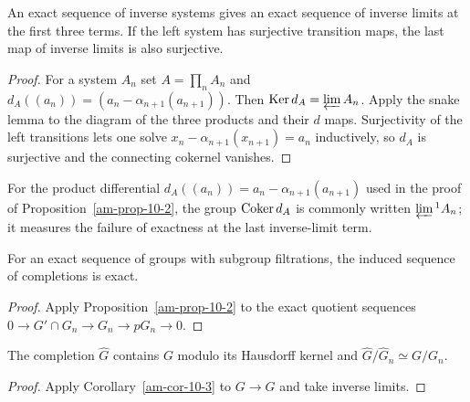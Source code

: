 \begin{proposition}
\label{am-prop-10-2}
\uses{}
An exact sequence of inverse systems gives an exact sequence of inverse limits
at the first three terms.  If the left system has surjective transition maps,
the last map of inverse limits is also surjective.
\end{proposition}
\begin{proof}
For a system $A_n$ set $A=\prod_nA_n$ and
$d_A((a_n))=(a_n-\alpha_{n+1}(a_{n+1}))$.  Then
$\operatorname{Ker} d_A=\varprojlim A_n$.  Apply the snake lemma to the diagram of the three
products and their $d$ maps.  Surjectivity of the left transitions lets one
solve $x_n-\alpha_{n+1}(x_{n+1})=a_n$ inductively, so $d_A$ is surjective and
the connecting cokernel vanishes.
\end{proof}
\begin{remark}
\label{am-rem-derived-limit}
\uses{}
For the product differential $d_A((a_n))=a_n-\alpha_{n+1}(a_{n+1})$ used in
the proof of Proposition~\ref{am-prop-10-2}, the group $\operatorname{Coker} d_A$ is commonly
written $\varprojlim{}^{1} A_n$; it measures the failure of exactness at the
last inverse-limit term.
\end{remark}
\begin{corollary}
\label{am-cor-10-3}
\uses{}
For an exact sequence of groups with subgroup filtrations, the induced sequence
of completions is exact.
\end{corollary}
\begin{proof}
Apply Proposition~\ref{am-prop-10-2} to the exact quotient sequences
$0\to G'\cap G_n\to G_n\to pG_n\to0$.
\end{proof}
\begin{corollary}
\label{am-cor-10-4}
\uses{}
The completion $\widehat G$ contains $G$ modulo its Hausdorff kernel and
$\widehat G/\widehat G_n\simeq G/G_n$.
\end{corollary}
\begin{proof}
Apply Corollary~\ref{am-cor-10-3} to $G\to\widehat G$ and take inverse limits.
\end{proof}
